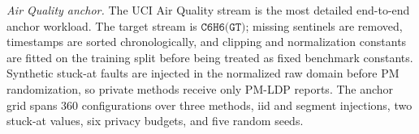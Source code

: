 \documentclass[conference]{IEEEtran}
\begin{document}
\noindent\emph{Air Quality anchor.}
The UCI Air Quality stream is the most detailed end-to-end anchor workload. The target stream is \(\texttt{C6H6(GT)}\); missing sentinels are removed, timestamps are sorted chronologically, and clipping and normalization constants are fitted on the training split before being treated as fixed benchmark constants. Synthetic stuck-at faults are injected in the normalized raw domain before PM randomization, so private methods receive only PM-LDP reports. The anchor grid spans 360 configurations over three methods, iid and segment injections, two stuck-at values, six privacy budgets, and five random seeds.

\begin{table}[t]
\centering
\caption{Air Quality anchor protocol.}
\label{tab:air_protocol}
\scriptsize
{}
\end{table}
\end{document}
